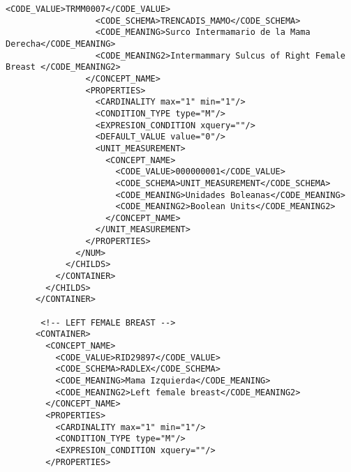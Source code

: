 \begin{lstlisting}[label=dicom-report,caption=Informe estructurado de una exploración de mama]
                  <CODE_VALUE>TRMM0007</CODE_VALUE>
                  <CODE_SCHEMA>TRENCADIS_MAMO</CODE_SCHEMA>
                  <CODE_MEANING>Surco Intermamario de la Mama Derecha</CODE_MEANING>
                  <CODE_MEANING2>Intermammary Sulcus of Right Female Breast </CODE_MEANING2>
                </CONCEPT_NAME>
                <PROPERTIES>
                  <CARDINALITY max="1" min="1"/>
                  <CONDITION_TYPE type="M"/>
                  <EXPRESION_CONDITION xquery=""/>
                  <DEFAULT_VALUE value="0"/>
                  <UNIT_MEASUREMENT>
                    <CONCEPT_NAME>
                      <CODE_VALUE>000000001</CODE_VALUE>
                      <CODE_SCHEMA>UNIT_MEASUREMENT</CODE_SCHEMA>
                      <CODE_MEANING>Unidades Boleanas</CODE_MEANING>
                      <CODE_MEANING2>Boolean Units</CODE_MEANING2>
                    </CONCEPT_NAME>
                  </UNIT_MEASUREMENT>
                </PROPERTIES>
              </NUM>
            </CHILDS>
          </CONTAINER>
        </CHILDS>
      </CONTAINER>

       <!-- LEFT FEMALE BREAST -->
      <CONTAINER>
        <CONCEPT_NAME>
          <CODE_VALUE>RID29897</CODE_VALUE>
          <CODE_SCHEMA>RADLEX</CODE_SCHEMA>
          <CODE_MEANING>Mama Izquierda</CODE_MEANING>
          <CODE_MEANING2>Left female breast</CODE_MEANING2>
        </CONCEPT_NAME>
        <PROPERTIES>
          <CARDINALITY max="1" min="1"/>
          <CONDITION_TYPE type="M"/>
          <EXPRESION_CONDITION xquery=""/>
        </PROPERTIES>


\end{lstlisting}
